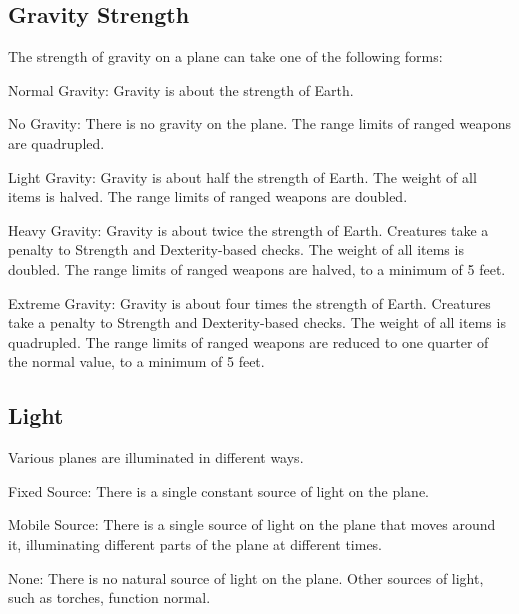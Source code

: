   \subsection{Gravity Strength} The strength of gravity on a plane can take one of the following forms:
    \begin{raggeditemize}
      \item Normal Gravity: Gravity is about the strength of Earth.
      \item No Gravity: There is no gravity on the plane.
        The range limits of ranged weapons are quadrupled.
      \item Light Gravity: Gravity is about half the strength of Earth.
        The weight of all items is halved.
        The range limits of ranged weapons are doubled.
      \item Heavy Gravity: Gravity is about twice the strength of Earth.
        Creatures take a  penalty to Strength and Dexterity-based checks.
        The weight of all items is doubled.
        The range limits of ranged weapons are halved, to a minimum of 5 feet.
      \item Extreme Gravity: Gravity is about four times the strength of Earth.
        Creatures take a  penalty to Strength and Dexterity-based checks.
        The weight of all items is quadrupled.
        The range limits of ranged weapons are reduced to one quarter of the normal value, to a minimum of 5 feet.
    \end{raggeditemize}

  \subsection{Light} Various planes are illuminated in different ways.
    \begin{raggeditemize}
      \item Fixed Source: There is a single constant source of light on the plane.
      \item Mobile Source: There is a single source of light on the plane that moves around it, illuminating different parts of the plane at different times.
      \item None: There is no natural source of light on the plane.
        Other sources of light, such as torches, function normal.
    \end{raggeditemize}

